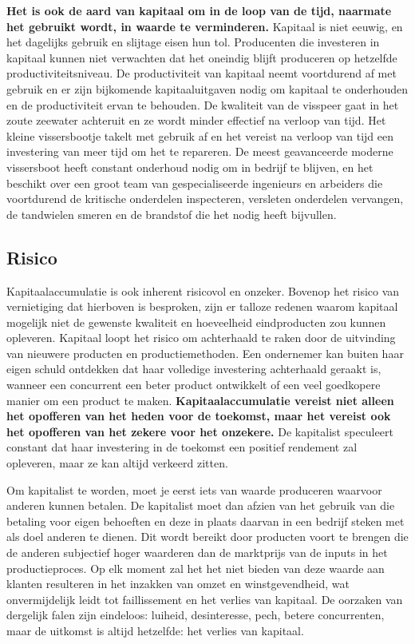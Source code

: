 \textbf{Het is ook de aard van kapitaal om in de loop van de tijd, naarmate het gebruikt wordt, in waarde te verminderen.} Kapitaal is niet eeuwig, en het dagelijks gebruik en slijtage eisen hun tol. Producenten die investeren in kapitaal kunnen niet verwachten dat het oneindig blijft produceren op hetzelfde productiviteitsniveau. De productiviteit van kapitaal neemt voortdurend af met gebruik en er zijn bijkomende kapitaaluitgaven nodig om kapitaal te onderhouden en de productiviteit ervan te behouden. De kwaliteit van de visspeer gaat in het zoute zeewater achteruit en ze wordt minder effectief na verloop van tijd. Het kleine vissersbootje takelt met gebruik af en het vereist na verloop van tijd een investering van meer tijd om het te repareren. De meest geavanceerde moderne vissersboot heeft constant onderhoud nodig om in bedrijf te blijven, en het beschikt over een groot team van gespecialiseerde ingenieurs en arbeiders die voortdurend de kritische onderdelen inspecteren, versleten onderdelen vervangen, de tandwielen smeren en de brandstof die het nodig heeft bijvullen.

\subsection{Risico}

Kapitaalaccumulatie is ook inherent risicovol en onzeker. Bovenop het risico van vernietiging dat hierboven is besproken, zijn er talloze redenen waarom kapitaal mogelijk niet de gewenste kwaliteit en hoeveelheid eindproducten zou kunnen opleveren. Kapitaal loopt het risico om achterhaald te raken door de uitvinding van nieuwere producten en productiemethoden. Een ondernemer kan buiten haar eigen schuld ontdekken dat haar volledige investering achterhaald geraakt is, wanneer een concurrent een beter product ontwikkelt of een veel goedkopere manier om een product te maken. \textbf{Kapitaalaccumulatie vereist niet alleen het opofferen van het heden voor de toekomst, maar het vereist ook het opofferen van het zekere voor het onzekere.} De kapitalist speculeert constant dat haar investering in de toekomst een positief rendement zal opleveren, maar ze kan altijd verkeerd zitten.

Om kapitalist te worden, moet je eerst iets van waarde produceren waarvoor anderen kunnen betalen. De kapitalist moet dan afzien van het gebruik van die betaling voor eigen behoeften en deze in plaats daarvan in een bedrijf steken met als doel anderen te dienen. Dit wordt bereikt door producten voort te brengen die de anderen subjectief hoger waarderen dan de marktprijs van de inputs in het productieproces. Op elk moment zal het het niet bieden van deze waarde aan klanten resulteren in het inzakken van omzet en winstgevendheid, wat onvermijdelijk leidt tot faillissement en het verlies van kapitaal. De oorzaken van dergelijk falen zijn eindeloos: luiheid, desinteresse, pech, betere concurrenten, maar de uitkomst is altijd hetzelfde: het verlies van kapitaal.

